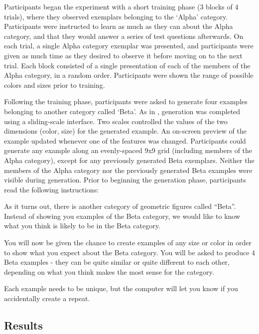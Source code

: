 \documentclass[12pt]{article}
\begin{document}
\begin{flushleft}
Participants began the experiment with a short training phase (3 blocks of 4 trials), where they observed exemplars belonging to the `Alpha' category. Participants were instructed to learn as much as they can about the Alpha category, and that they would answer a series of test questions afterwards. On each trial, a single Alpha category exemplar was presented, and participants were given as much time as they desired to observe it before moving on to the next trial. Each block consisted of a single presentation of each of the members of the Alpha category, in a random order. Participants were shown the range of possible colors and sizes prior to training.

Following the training phase, participants were asked to generate four examples belonging to another category called `Beta'. As in \citet{jern2013probabilistic}, generation was completed using a sliding-scale interface. Two scales controlled the values of the two dimensions (color, size)  for the generated example. An on-screen preview of the example updated whenever one of the features was changed. Participants could generate any example along an evenly-spaced 9x9 grid (including members of the Alpha category), except for any previously generated Beta exemplars. Neither the members of the Alpha category nor the previously generated Beta examples were visible during generation. Prior to beginning the generation phase, participants read the following instructions:

\begin{displayquote}
As it turns out, there is another category of geometric figures called ``Beta''. Instead of showing you examples of the Beta category, we would like to know what you think is likely to be in the Beta category. 

You will now be given the chance to create examples of any size or color in order to show what you expect about the Beta category. You will be asked to produce 4 Beta examples - they can be quite similar or quite different to each other, depending on what you think makes the most sense for the category.

Each example needs to be unique, but the computer will let you know if you accidentally create a repeat.
\end{displayquote}

\subsection{Results}


\end{flushleft}
\end{document}
